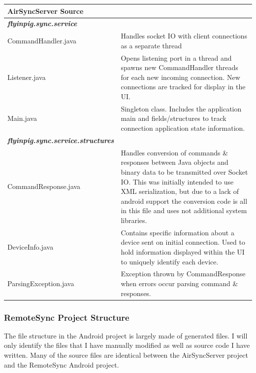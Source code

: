 \documentclass[12pt]{article}
\begin{document}
\begin{center}
\begin{tabular}{|l|p{7.5cm}|}
\hline
	\textbf{AirSyncServer Source} \\
\hline
	\emph{\textbf{flyinpig.sync.service}}\\
\hline 
	CommandHandler.java
	& Handles socket IO with client connections as a separate thread\\
\hline
	Listener.java
	& Opens listening port in a thread and spawns new CommandHandler threads for each new incoming connection. New connections are tracked for display in the UI.\\
\hline
	Main.java
	& Singleton class. Includes the application main and fields/structures to track connection application state information.\\
\hline
	\emph{\textbf{flyinpig.sync.service.structures}}\\
\hline
	CommandResponse.java
	& Handles conversion of commands \& responses between Java objects and binary data to be transmitted over Socket IO. This was initially intended to use XML serialization, but due to a lack of android support the conversion code is all in this file and uses not additional system libraries.\\
\hline
	DeviceInfo.java
	& Contains specific information about a device sent on initial connection. Used to hold information displayed within the UI to uniquely identify each device.\\
\hline
	ParsingException.java
	& Exception thrown by CommandResponse when errors occur parsing command \& responses.\\
\hline
\end{tabular}
\end{center}


\subsubsection{RemoteSync Project Structure}

The file structure in the Android project is largely made of generated files. I will only identify the files that I have manually modified as well as source code I have written. Many of the source files are identical between the AirSyncServer project and the RemoteSync Android project.
\end{document}
